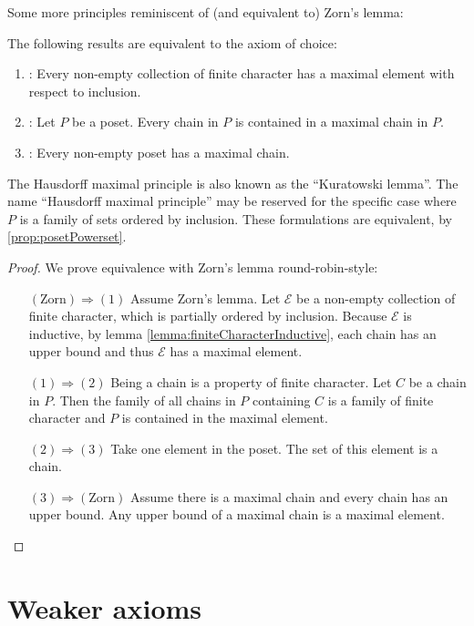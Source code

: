 Some more principles reminiscent of (and equivalent to) Zorn's lemma:
\begin{theorem} \label{theorem:ZornEquivalents}
The following results are equivalent to the axiom of choice:
\begin{enumerate}
\item {}: Every non-empty collection of finite character has a maximal element with respect to inclusion.
\item {}: Let $P$ be a poset. Every chain in $P$ is contained in a maximal chain in $P$.
\item {}: Every non-empty poset has a maximal chain.
\end{enumerate}
\end{theorem}
The Hausdorff maximal principle is also known as the ``Kuratowski lemma''. The name ``Hausdorff maximal principle'' may be reserved for the specific case where $P$ is a family of sets ordered by inclusion. These formulations are equivalent, by \ref{prop:posetPowerset}.
\begin{proof}
We prove equivalence with Zorn's lemma round-robin-style:
\begin{itemize}[leftmargin=2cm]
\item[$\boxed{(\text{Zorn}) \Rightarrow (1)}$] Assume Zorn's lemma. Let $\mathcal{E}$ be a non-empty collection of finite character, which is partially ordered by inclusion. Because $\mathcal{E}$ is inductive, by lemma \ref{lemma:finiteCharacterInductive}, each chain has an upper bound and thus $\mathcal{E}$ has a maximal element.
\item[$\boxed{(1) \Rightarrow (2)}$] Being a chain is a property of finite character. Let $C$ be a chain in $P$. Then the family of all chains in $P$ containing $C$ is a family of finite character and $P$ is contained in the maximal element.
\item[$\boxed{(2) \Rightarrow (3)}$] Take one element in the poset. The set of this element is a chain.
\item[$\boxed{(3) \Rightarrow (\text{Zorn})}$] Assume there is a maximal chain and every chain has an upper bound. Any upper bound of a maximal chain is a maximal element.
\end{itemize}
\end{proof}

\section{Weaker axioms}
